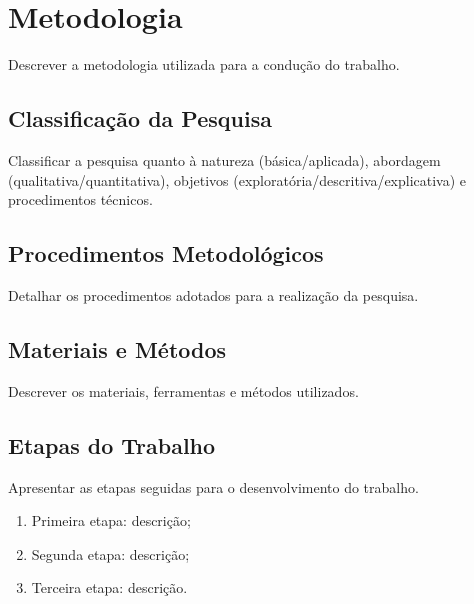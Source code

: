 \chapter{Metodologia}
\label{chap:metodologia}

Descrever a metodologia utilizada para a condução do trabalho.

\section{Classificação da Pesquisa}

Classificar a pesquisa quanto à natureza (básica/aplicada), abordagem
(qualitativa/quantitativa), objetivos (exploratória/descritiva/explicativa)
e procedimentos técnicos.

\section{Procedimentos Metodológicos}

Detalhar os procedimentos adotados para a realização da pesquisa.

\section{Materiais e Métodos}

Descrever os materiais, ferramentas e métodos utilizados.

\section{Etapas do Trabalho}

Apresentar as etapas seguidas para o desenvolvimento do trabalho.

\begin{enumerate}
    \item Primeira etapa: descrição;
    \item Segunda etapa: descrição;
    \item Terceira etapa: descrição.
\end{enumerate}
